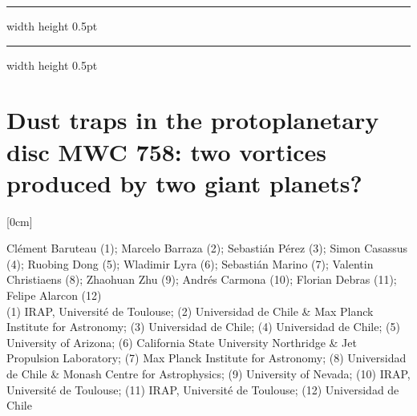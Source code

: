 \documentclass[a4paper,11pt]{book}
\def\doubleline{
\hrule width \hsize height 0.5pt  \kern 1mm \hrule width \hsize height 0.5pt 
}
\begin{document}
\noindent\doubleline
        
          \section[Dust traps in the protoplanetary disc MWC 758: two vortices produced by two giant planets? \newline(Clément Baruteau)] { Dust traps in the protoplanetary disc MWC 758: two vortices produced by two giant planets? }



[0cm]



\begin{center}
    
{\large Clément Baruteau (1)};{ \large  Marcelo Barraza (2)};{ \large  Sebastián Pérez (3)};{ \large  Simon Casassus (4)};{ \large  Ruobing Dong (5)};{ \large  Wladimir Lyra (6)};{ \large  Sebastián Marino (7)};{ \large  Valentin Christiaens (8)};{ \large  Zhaohuan Zhu (9)};{ \large  Andrés Carmona (10)};{ \large  Florian Debras (11)};{ \large  Felipe Alarcon (12)}\\
  
\vspace{2 mm}
\noindent (1) IRAP, Université de Toulouse; (2)  Universidad de Chile \& Max Planck Institute for Astronomy; (3)  Universidad de Chile; (4)  Universidad de Chile; (5)  University of Arizona; (6)  California State University Northridge \& Jet Propulsion Laboratory; (7)  Max Planck Institute for Astronomy; (8)  Universidad de Chile \& Monash Centre for Astrophysics; (9)  University of Nevada; (10)  IRAP, Université de Toulouse; (11)  IRAP, Université de Toulouse; (12)  Universidad de Chile\\

\end{center}
\end{document}
